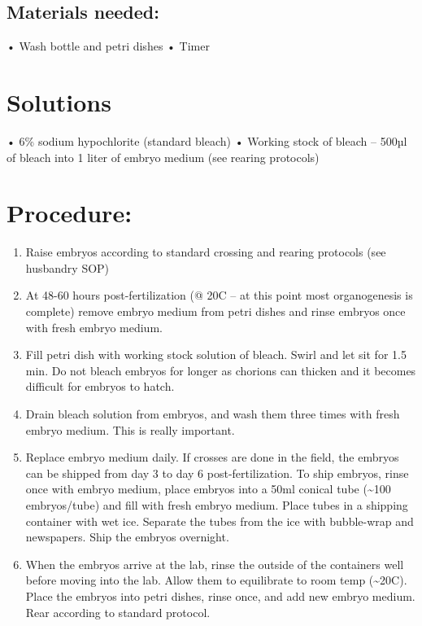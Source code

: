 \documentclass[
]{book}
\begin{document}
\hypertarget{materials-needed}{%
\subsection{Materials needed:}\label{materials-needed}}

• Wash bottle and petri dishes
• Timer

\hypertarget{solutions}{%
\section{Solutions}\label{solutions}}

• 6\% sodium hypochlorite (standard bleach)
• Working stock of bleach -- 500µl of bleach into 1 liter of embryo medium (see rearing protocols)

\hypertarget{procedure}{%
\section{Procedure:}\label{procedure}}

\begin{enumerate}
\def\labelenumi{\arabic{enumi}.}
\item
  Raise embryos according to standard crossing and rearing protocols (see husbandry SOP)
\item
  At 48-60 hours post-fertilization (@ 20C -- at this point most organogenesis is complete) remove embryo medium from petri dishes and rinse embryos once with fresh embryo medium.
\item
  Fill petri dish with working stock solution of bleach. Swirl and let sit for 1.5 min. Do not bleach embryos for longer as chorions can thicken and it becomes difficult for embryos to hatch.
\item
  Drain bleach solution from embryos, and wash them three times with fresh embryo medium. This is really important.
\item
  Replace embryo medium daily. If crosses are done in the field, the embryos can be shipped from day 3 to day 6 post-fertilization. To ship embryos, rinse once with embryo medium, place embryos into a 50ml conical tube (\textasciitilde100 embryos/tube) and fill with fresh embryo medium. Place tubes in a shipping container with wet ice. Separate the tubes from the ice with bubble-wrap and newspapers. Ship the embryos overnight.
\item
  When the embryos arrive at the lab, rinse the outside of the containers well before moving into the lab. Allow them to equilibrate to room temp (\textasciitilde20C). Place the embryos into petri dishes, rinse once, and add new embryo medium. Rear according to standard protocol.
\end{enumerate}
\end{document}
